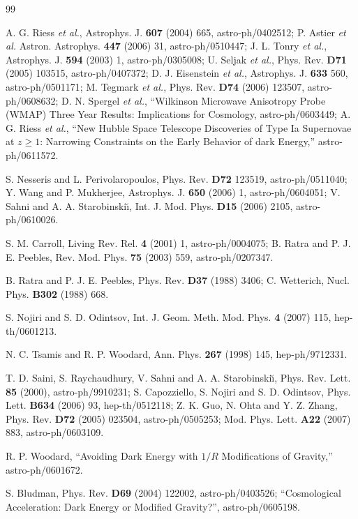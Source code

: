 \documentclass[12pt]{article}
\begin{document}
\begin{thebibliography}{99}

 A. G. Riess {\it et al.}, Astrophys. J. {\bf 607} (2004)
665, astro-ph/0402512;
P. Astier {\it et al.} Astron. Astrophys. {\bf 447} (2006)
31, astro-ph/0510447; J. L. Tonry {\it et al.}, Astrophys. J. {\bf 594} (2003)
1, astro-ph/0305008;
U. Seljak {\it et al.}, Phys. Rev. {\bf D71} (2005)
103515, astro-ph/0407372;
D. J. Eisenstein {\it et al.}, Astrophys. J. {\bf 633}
560, astro-ph/0501171;
M. Tegmark {\it et al.}, Phys. Rev. {\bf D74} (2006)
123507, astro-ph/0608632;
D. N. Spergel {\it et al.}, ``Wilkinson Microwave
Anisotropy Probe (WMAP) Three Year Results: Implications for Cosmology,
astro-ph/0603449;
A. G. Riess {\it et al.}, ``New Hubble Space Telescope
Discoveries of Type Ia Supernovae at $z \geq 1$: Narrowing Constraints on
the Early Behavior of dark Energy,'' astro-ph/0611572.

 S. Nesseris and L. Perivolaropoulos, Phys. Rev. {\bf D72}
123519, astro-ph/0511040;
Y. Wang and P. Mukherjee, Astrophys. J. {\bf 650} (2006) 1,
astro-ph/0604051;
V. Sahni and A. A. Starobinski\u{\i}, Int. J. Mod. Phys.
{\bf D15} (2006) 2105, astro-ph/0610026.

 S. M. Carroll, Living Rev. Rel. {\bf 4} (2001) 1,
astro-ph/0004075;
B. Ratra and P. J. E. Peebles, Rev. Mod. Phys. {\bf 75}
(2003) 559, astro-ph/0207347.

 B. Ratra and P. J. E. Peebles, Phys. Rev. {\bf D37} (1988)
3406; C. Wetterich, Nucl. Phys. {\bf B302} (1988) 668.

 S. Nojiri and S. D. Odintsov, Int. J. Geom. Meth. Mod. Phys.
{\bf 4} (2007) 115, hep-th/0601213.

 N. C. Tsamis and R. P. Woodard, Ann. Phys. {\bf 267} (1998)
145, hep-ph/9712331.

 T. D. Saini, S. Raychaudhury, V. Sahni and A. A.
Starobinski\u{\i}, Phys. Rev. Lett. {\bf 85} (2000), astro-ph/9910231;
S. Capozziello, S. Nojiri and S. D. Odintsov, Phys. Lett.
{\bf B634} (2006) 93, hep-th/0512118;
Z. K. Guo, N. Ohta and Y. Z. Zhang, Phys. Rev. {\bf D72}
(2005) 023504, astro-ph/0505253; Mod. Phys. Lett. {\bf A22} (2007) 883,
astro-ph/0603109.

 R. P. Woodard, ``Avoiding Dark Energy with $1/R$ Modifications
of Gravity,'' astro-ph/0601672.

 S. Bludman, Phys. Rev. {\bf D69} (2004) 122002,
astro-ph/0403526; ``Cosmological Acceleration: Dark Energy
or Modified Gravity?'', astro-ph/0605198.


\end{thebibliography}
\end{document}
